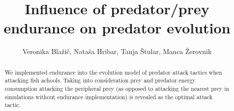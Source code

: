 \documentclass[internal]{FRIreport}
\begin{document}
\title{Influence of predator/prey endurance on predator evolution}

\author[ \etal]{Veronika Blažič, Nataša Hribar, Tanja Štular, Manca Žerovnik}

\address{University of Ljubljana, Faculty of Computer and Information Science, Ljubljana, Slovenia}

\begin{abstract}
We implemented endurance into the evolution model of predator attack tactics when attacking fish achools. Taking into consideration prey and predator energy consumption attacking the peripheral prey (as opposed to attacking the nearest prey in simulations without endurance implementation) is revealed as the optimal attack tactic. 

\end{abstract}



%
\end{document}

